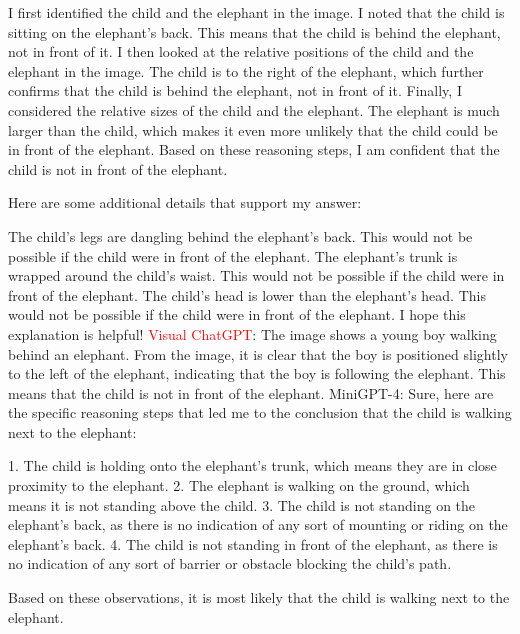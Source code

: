 \begin{enumerate}
        I first identified the child and the elephant in the image.
        I noted that the child is sitting on the elephant's back. This means that the child is behind the elephant, not in front of it.
        I then looked at the relative positions of the child and the elephant in the image. The child is to the right of the elephant, which further confirms that the child is behind the elephant, not in front of it.
        Finally, I considered the relative sizes of the child and the elephant. The elephant is much larger than the child, which makes it even more unlikely that the child could be in front of the elephant.
        Based on these reasoning steps, I am confident that the child is not in front of the elephant.

        Here are some additional details that support my answer:

        The child's legs are dangling behind the elephant's back. This would not be possible if the child were in front of the elephant.
        The elephant's trunk is wrapped around the child's waist. This would not be possible if the child were in front of the elephant.
        The child's head is lower than the elephant's head. This would not be possible if the child were in front of the elephant.
        I hope this explanation is helpful!
        \subitem \textcolor{red}{Visual ChatGPT}: The image shows a young boy walking behind an elephant. From the image, it is clear that the boy is positioned slightly to the left of the elephant, indicating that the boy is following the elephant. This means that the child is not in front of the elephant.
        \subitem MiniGPT-4: Sure, here are the specific reasoning steps that led me to the conclusion that the child is walking next to the elephant:

        1. The child is holding onto the elephant’s trunk, which means they are in close proximity to the elephant.
        2. The elephant is walking on the ground, which means it is not standing above the child.
        3. The child is not standing on the elephant’s back, as there is no indication of any sort of mounting or riding on the elephant’s back.
        4. The child is not standing in front of the elephant, as there is no indication of any sort of barrier or obstacle blocking the child’s path.
        
        Based on these observations, it is most likely that the child is walking next to the elephant.
    \end{enumerate}
